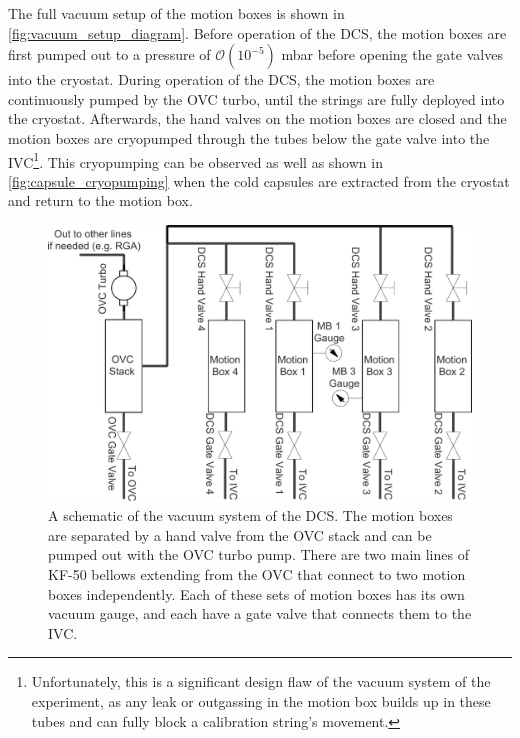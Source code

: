 The full vacuum setup of the motion boxes is shown in \autoref{fig:vacuum_setup_diagram}.
Before operation of the DCS, the motion boxes are first pumped out to a pressure of $\mathcal{O}(10^{-5})$ mbar before opening the gate valves into the cryostat.
During operation of the DCS, the motion boxes are continuously pumped by the OVC turbo, until the strings are fully deployed into the cryostat.
Afterwards, the hand valves on the motion boxes are closed and the motion boxes are cryopumped through the tubes below the gate valve into the IVC\footnote{Unfortunately, this is a significant design flaw of the vacuum system of the experiment, as any leak or outgassing in the motion box builds up in these tubes and can fully block a calibration string's movement.}.
This cryopumping can be observed as well as shown in \autoref{fig:capsule_cryopumping} when the cold capsules are extracted from the cryostat and return to the motion box.

\begin{figure}[htbp]
    \centering
    \includegraphics[width=0.9\linewidth]{Figures/DCS_Vacuum_System_Edit.pdf}
    \caption[A schematic of the vacuum system of the DCS]
    {A schematic of the vacuum system of the DCS.
    The motion boxes are separated by a hand valve from the OVC stack and can be pumped out with the OVC turbo pump.
    There are two main lines of KF-50 bellows extending from the OVC that connect to two motion boxes independently.
    Each of these sets of motion boxes has its own vacuum gauge, and each have a gate valve that connects them to the IVC.}
    \label{fig:vacuum_setup_diagram}
\end{figure}


